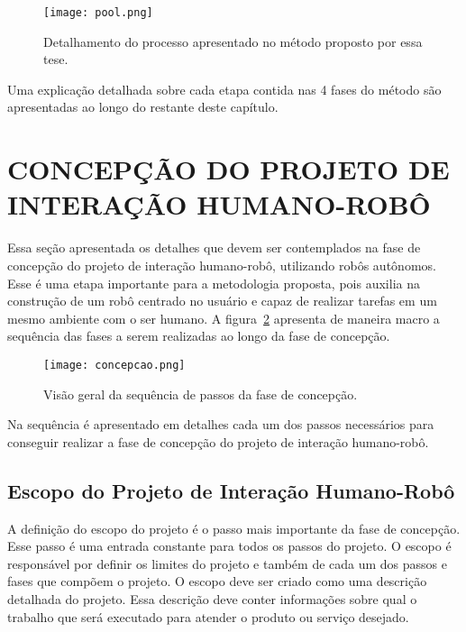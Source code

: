 \begin{figure}[ht!]
	\centering
	\begin{minipage}{\textwidth}
		\caption{Detalhamento do processo apresentado no método proposto por essa tese.}
		\texttt{[image: pool.png]}
		\label{fig:pool}
	\end{minipage}
\end{figure}


Uma explicação detalhada sobre cada etapa contida nas 4 fases do método são apresentadas ao longo do restante deste capítulo.

\section{CONCEPÇÃO DO PROJETO DE INTERAÇÃO HUMANO-ROBÔ}
\label{sec:concepcao}
Essa seção apresentada os detalhes que devem ser contemplados na fase de concepção do projeto de interação humano-robô, utilizando robôs autônomos. Esse é uma etapa importante para a metodologia proposta, pois auxilia na construção de um robô centrado no usuário e capaz de realizar tarefas em um mesmo ambiente com o ser humano. A figura~\ref{fig:concepcao} apresenta de maneira macro a sequência das fases a serem realizadas ao longo da fase de concepção.

\begin{figure}[ht!]
    \centering
    \begin{minipage}{\textwidth}
        \caption{Visão geral da sequência de passos da fase de concepção.}
        \texttt{[image: concepcao.png]}
        \label{fig:concepcao}
    \end{minipage}
\end{figure}

Na sequência é apresentado em detalhes cada um dos passos necessários para conseguir realizar a fase de concepção do projeto de interação humano-robô.

\subsection{Escopo do Projeto de Interação Humano-Robô}
\label{sec:escopo}
A definição do escopo do projeto é o passo mais importante da fase de concepção. Esse passo é uma entrada constante para todos os passos do projeto. O escopo é responsável por definir os limites do projeto e também de cada um dos passos e fases que compõem o projeto. O escopo deve ser criado como uma descrição detalhada do projeto. Essa descrição deve conter informações sobre qual o trabalho que será executado para atender o produto ou serviço desejado. 

